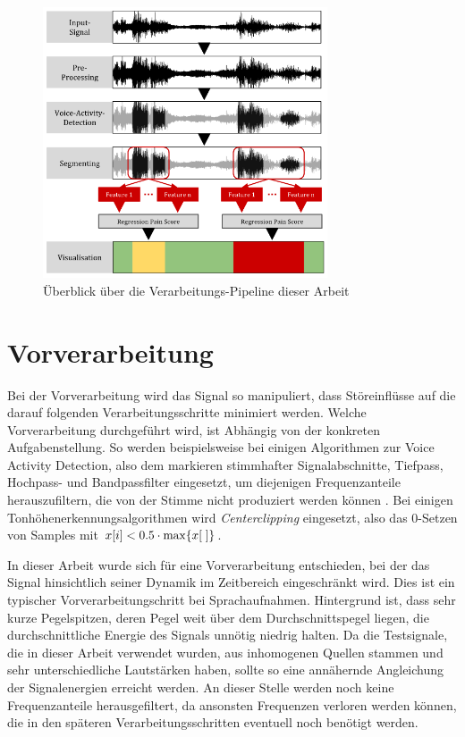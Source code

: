 \begin{figure}[H]
	\centering
	\includegraphics[width=0.75\textwidth]{bilder/pipeline01.png}
	\caption{Überblick über die Verarbeitungs-Pipeline dieser Arbeit}
	\label{img:architecture-overview}
\end{figure}

\section{Vorverarbeitung}
\label{sec:preprocessing}

Bei der Vorverarbeitung wird das Signal so manipuliert, dass Störeinflüsse auf die darauf folgenden Verarbeitungsschritte minimiert werden. Welche Vorverarbeitung durchgeführt wird, ist Abhängig von der konkreten Aufgabenstellung. So werden beispielsweise bei einigen Algorithmen zur Voice Activity Detection, also dem markieren stimmhafter Signalabschnitte, Tiefpass, Hochpass- und Bandpassfilter eingesetzt, um diejenigen Frequenzanteile herauszufiltern, die von der Stimme nicht produziert werden können \cite{vad_entropy} \cite{vad_ceps} \cite{vad_kola}. Bei einigen Tonhöhenerkennungsalgorithmen wird \emph{Centerclipping} eingesetzt, also das 0-Setzen von Samples mit $ x[i] < 0.5 \cdot \operatorname*{max}\{x[\;]\}$.\cite{czechPitch} 

In dieser Arbeit wurde sich für eine Vorverarbeitung entschieden, bei der das Signal hinsichtlich seiner Dynamik im Zeitbereich eingeschränkt wird. Dies ist ein typischer Vorverarbeitungschritt bei Sprachaufnahmen. Hintergrund ist, dass sehr kurze Pegelspitzen, deren Pegel weit über dem Durchschnittspegel liegen, die durchschnittliche Energie des Signals unnötig niedrig halten. Da die Testsignale, die in dieser Arbeit verwendet wurden, aus inhomogenen Quellen stammen und sehr unterschiedliche Lautstärken haben, sollte so eine annähernde Angleichung der Signalenergien erreicht werden. An dieser Stelle werden noch keine Frequenzanteile herausgefiltert, da ansonsten Frequenzen verloren werden können, die in den späteren Verarbeitungsschritten eventuell noch benötigt werden.

